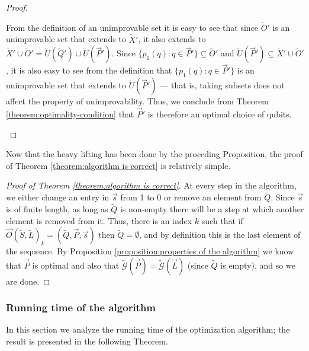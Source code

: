 \documentclass[twocolumn,showpacs,preprintnumbers,amsmath,amssymb,nofootinbib,pra,floatfix]{revtex4-1}
\newenvironment{remark}[1][Remark]{\begin{trivlist}
\item[\hskip \labelsep {\bfseries #1}]}{\end{trivlist}}
\newcommand{\lst}{\vec}
\newcommand{\set}{\tilde}
\newcommand{\genfun}{\tilde{\mathcal{G}}}
\begin{document}
\begin{proof}
\begin{enumerate}
From the definition of an unimprovable set it is easy to see that since $\set O'$ is an unimprovable set that extends to $\set X'$, it also extends to $\set X'\cup\set O'=\set U(\set Q')\cup\set U(\lst P')$.  Since $\{p_1(q):q\in\lst P'\}\subseteq \set O'$ and $\set U(\lst P')\subseteq \set X'\cup\set O'$, it is also easy to see from the definition that $\{p_1(q):q\in\lst P'\}$ is an unimprovable set that extends to $\set U(\lst P')$ --- that is, taking subsets does not affect the property of unimprovability.  Thus, we conclude from Theorem \ref{theorem:optimality-condition} that $\lst P'$ is therefore an optimal choice of qubits.
\end{enumerate}
\end{proof}
\begin{remark}
Now that the heavy lifting has been done by the proceding Proposition, the proof of Theorem \ref{theorem:algorithm is correct} is relatively simple.
\end{remark}

\begin{proof}[Proof of Theorem \ref{theorem:algorithm is correct}]
At every step in the algorithm, we either change an entry in $\lst s$ from 1 to 0 or remove an element from $\set Q$.  Since $\lst s$ is of finite length, as long as $\set Q$ is non-empty there will be a step at which another element is removed from it.  Thus, there is an index $k$ such that if $\lst O(\set S,\set L)_k=(\set Q,\lst P,\lst s)$ then $\set Q=\emptyset$, and by definition this is the last element of the sequence.  By Proposition \ref{proposition:properties of the algorithm} we know that $\lst P$ is optimal and also that $\genfun(\lst P)=\genfun(\lst L)$ (since $\set Q$ is empty), and so we are done.
\end{proof}
\subsubsection{Running time of the algorithm}

\label{subsubsection:running time analysis}

In this section we analyze the running time of the optimization algorithm;  the result is presented in the following Theorem.
\end{document}
